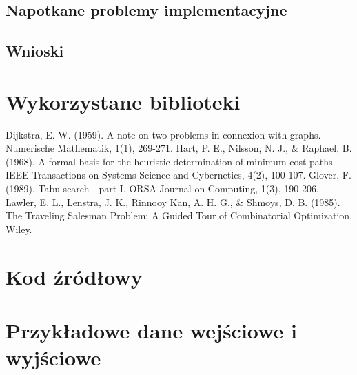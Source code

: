 \documentclass[12pt,a4paper]{article}
\begin{document}
\subsection{Napotkane problemy implementacyjne}

\subsection{Wnioski}

\section{Wykorzystane biblioteki}

\begin{thebibliography}{9}
     Dijkstra, E. W. (1959). A note on two problems in connexion with graphs. Numerische Mathematik, 1(1), 269-271.
     Hart, P. E., Nilsson, N. J., & Raphael, B. (1968). A formal basis for the heuristic determination of minimum cost paths. IEEE Transactions on Systems Science and Cybernetics, 4(2), 100-107.
     Glover, F. (1989). Tabu search—part I. ORSA Journal on Computing, 1(3), 190-206.
     Lawler, E. L., Lenstra, J. K., Rinnooy Kan, A. H. G., & Shmoys, D. B. (1985). The Traveling Salesman Problem: A Guided Tour of Combinatorial Optimization. Wiley.
\end{thebibliography}

\appendix
\section{Kod źródłowy}

\section{Przykładowe dane wejściowe i wyjściowe}
\end{document}
